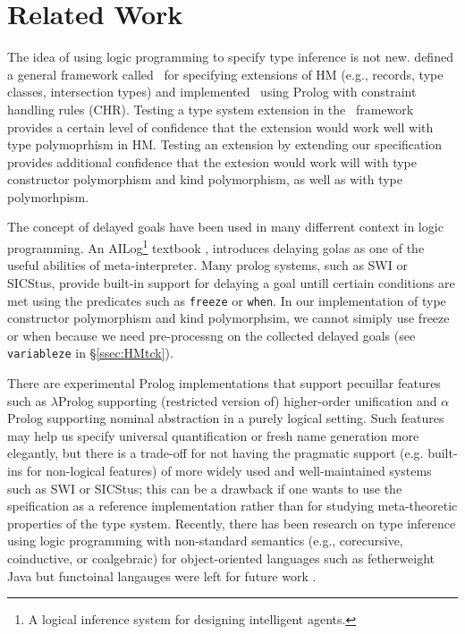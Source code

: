 \section{Related Work}\label{sec:relwork}
The idea of using logic programming to specify type inference is not new.
\citet*{HMX99} defined a general framework called \HMX\ for specifying
extensions of HM (e.g., records, type classes, intersection types)
and \citet{tyinferCHR02} implemented \HMX\ using Prolog with
constraint handling rules (CHR). Testing a type system extension
in the \HMX\ framework provides a certain level of confidence that the extension
would work well with type polymoprhism in HM. Testing an extension by
extending our specification provides additional confidence that the extesion
would work will with type constructor polymorphism and kind polymorphism,
as well as with type polymorhpism.

The concept of delayed goals have been used in many differrent context
in logic programming. An AILog\footnote{A logical inference system for designing
	 intelligent agents.} textbook \cite{AILogTextBook},
introduces delaying golas as one of the useful abilities of meta-interpreter.
Many prolog systems, such as SWI or SICStus, provide built-in support for
delaying a goal untill certiain conditions are met using the predicates
such as \verb|freeze| or \verb|when|. In our implementation of
type constructor polymorphism and kind polymorphsim, we cannot
simiply use freeze or when because we need pre-processng on
the collected delayed goals (see \verb|variableze| in \S\ref{ssec:HMtck}).


There are experimental Prolog implementations that support pecuillar features
such as
$\lambda$Prolog supporting (restricted version of) higher-order unification
and 
$\alpha$Prolog supporting nominal abstraction in a purely logical setting.
Such features may help us specify universal quantification or fresh name
generation more elegantly, but there is a trade-off for not having the
pragmatic support (e.g. built-ins for non-logical features) of more widely used
and well-maintained systems such as SWI or SICStus; this can be a drawback if
one wants to use the speification as a reference implementation rather than
for studying meta-theoretic properties of the type system.
Recently, there has been research on type inference using logic programming
with non-standard semantics (e.g., corecursive, coinductive, or coalgebraic)
for object-oriented languages such as fetherweight Java but functoinal langauges
were left for future work \cite{AnconaLZ08}.

